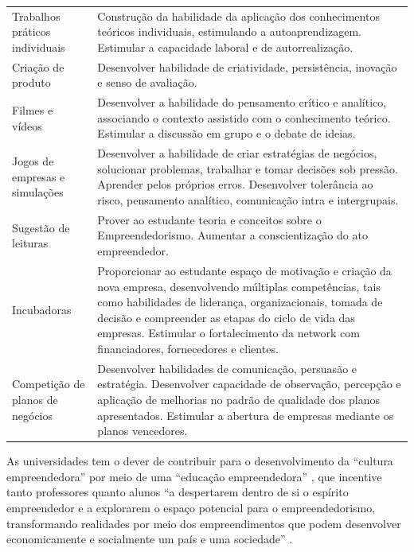 \begin{center}
\begin{longtable}{p{3.5cm}p{11.0cm}}
Trabalhos práticos individuais & Construção da habilidade da aplicação dos conhecimentos teóricos
individuais, estimulando a autoaprendizagem. Estimular a capacidade
laboral e de autorrealização. \\ 

Criação de produto & Desenvolver habilidade de criatividade, persistência, inovação e senso de
avaliação. \\ 

Filmes e vídeos & Desenvolver a habilidade do pensamento crítico e analítico, associando o
contexto assistido com o conhecimento teórico. Estimular a discussão em grupo e o debate de ideias. \\ 

Jogos de empresas e simulações & Desenvolver a habilidade de criar estratégias de negócios, solucionar
problemas, trabalhar e tomar decisões sob pressão. Aprender pelos próprios erros. Desenvolver tolerância ao risco, pensamento analítico, comunicação intra e intergrupais. \\ 

Sugestão de leituras & Prover ao estudante teoria e conceitos sobre o Empreendedorismo. Aumentar a conscientização do ato empreendedor. \\ 
Incubadoras & Proporcionar ao estudante espaço de motivação e criação da nova empresa, desenvolvendo múltiplas competências, tais como habilidades de liderança, organizacionais, tomada de decisão e compreender as etapas do ciclo de vida das empresas. Estimular o fortalecimento da network com financiadores, fornecedores e clientes. \\

Competição de planos de negócios & Desenvolver habilidades de comunicação, persuasão e estratégia.
Desenvolver capacidade de observação, percepção e aplicação de melhorias no padrão de qualidade dos planos apresentados. Estimular a abertura de empresas mediante os planos vencedores. \\ 

\end{longtable}
\end{center}



As universidades tem o dever de contribuir para o desenvolvimento da “cultura empreendedora” por meio de uma “educação empreendedora” \cite{tscha_empreendendo_2014}, que incentive tanto professores quanto alunos “a despertarem dentro de si o espírito empreendedor e a explorarem o espaço potencial para o empreendedorismo, transformando realidades por meio dos empreendimentos que podem desenvolver economicamente e socialmente um país e uma sociedade” \cite{tscha_empreendendo_2014}. 

